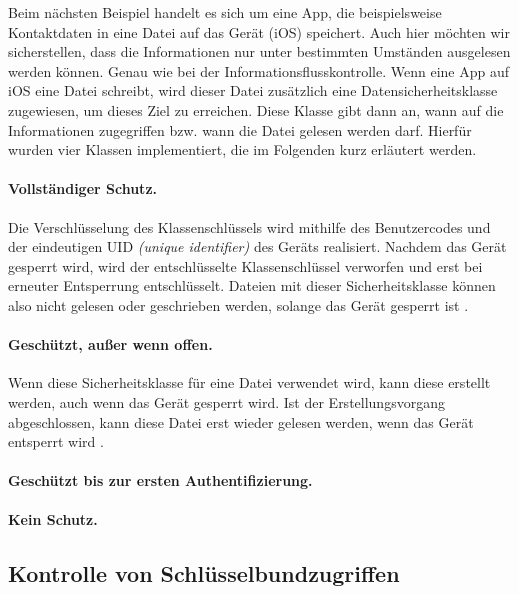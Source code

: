 Beim nächsten Beispiel handelt es sich um eine App, die beispielsweise
Kontaktdaten in eine Datei auf das Gerät (iOS) speichert. Auch hier möchten wir
sicherstellen, dass die Informationen nur unter bestimmten Umständen ausgelesen
werden können.  Genau wie bei der Informationsflusskontrolle. Wenn eine App auf
iOS eine Datei schreibt, wird dieser Datei zusätzlich eine
Datensicherheitsklasse zugewiesen, um dieses Ziel zu erreichen. Diese Klasse
gibt dann an, wann auf die Informationen zugegriffen bzw. wann die Datei gelesen
werden darf. Hierfür wurden vier Klassen implementiert, die im Folgenden kurz
erläutert werden.

\paragraph{Vollständiger Schutz.}{Die Verschlüsselung des Klassenschlüssels wird
mithilfe des Benutzercodes und der eindeutigen UID \textit{(unique identifier)}
des Geräts realisiert. Nachdem das Gerät gesperrt wird, wird der entschlüsselte
Klassenschlüssel verworfen und erst bei erneuter Entsperrung entschlüsselt.
Dateien mit dieser Sicherheitsklasse können also nicht gelesen oder geschrieben
werden, solange das Gerät gesperrt ist \cite{appledev}.}

\paragraph{Geschützt, außer wenn offen.}{Wenn diese Sicherheitsklasse für eine
Datei verwendet wird, kann diese erstellt werden, auch wenn das Gerät gesperrt
wird. Ist der Erstellungsvorgang abgeschlossen, kann diese Datei erst wieder
gelesen werden, wenn das Gerät entsperrt wird \cite{appledev}.}

\paragraph{Geschützt bis zur ersten Authentifizierung.}{}

\paragraph{Kein Schutz.}{}

\subsection{Kontrolle von Schlüsselbundzugriffen}
